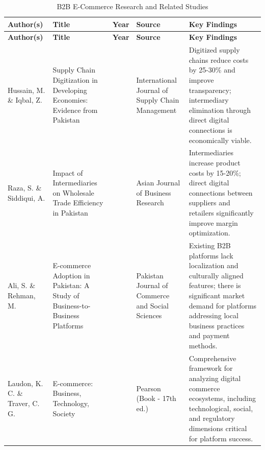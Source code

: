 \renewcommand{\arraystretch}{1.3}
\small
\begin{longtable}{|>{\raggedright}p{1.8cm}|>{\raggedright}p{3cm}|>{\centering}p{0.8cm}|>{\raggedright}p{2cm}|>{\raggedright\arraybackslash}p{4.5cm}|}
\caption{B2B E-Commerce Research and Related Studies}
\label{tab:literature_review}\\
\hline
\rowcolor{lightgray}
\textbf{Author(s)} & \textbf{Title} & \textbf{Year} & \textbf{Source} & \textbf{Key Findings} \\
\hline
\endfirsthead

\hline
\rowcolor{lightgray}
\textbf{Author(s)} & \textbf{Title} & \textbf{Year} & \textbf{Source} & \textbf{Key Findings} \\
\hline
\endhead

\hline
\endfoot

\hline
\endlastfoot

Hussain, M. \& Iqbal, Z. & Supply Chain Digitization in Developing Economies: Evidence from Pakistan\cite{hussain2023supply} & 2023 & International Journal of Supply Chain Management & Digitized supply chains reduce costs by 25-30\% and improve transparency; intermediary elimination through direct digital connections is economically viable. \\
\hline

Raza, S. \& Siddiqui, A. & Impact of Intermediaries on Wholesale Trade Efficiency in Pakistan\cite{raza2023impact} & 2023 & Asian Journal of Business Research & Intermediaries increase product costs by 15-20\%; direct digital connections between suppliers and retailers significantly improve margin optimization. \\
\hline

Ali, S. \& Rehman, M. & E-commerce Adoption in Pakistan: A Study of Business-to-Business Platforms\cite{ali2022ecommerce} & 2022 & Pakistan Journal of Commerce and Social Sciences & Existing B2B platforms lack localization and culturally aligned features; there is significant market demand for platforms addressing local business practices and payment methods. \\
\hline

Laudon, K. C. \& Traver, C. G. & E-commerce: Business, Technology, Society\cite{laudon2023ecommerce} & 2023 & Pearson (Book - 17th ed.) & Comprehensive framework for analyzing digital commerce ecosystems, including technological, social, and regulatory dimensions critical for platform success. \\
\hline


\end{longtable}
